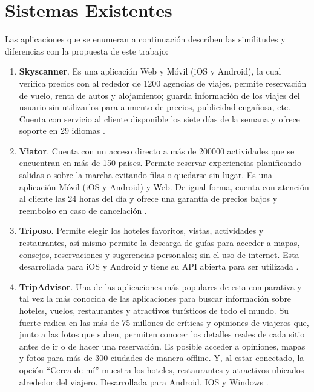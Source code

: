 \section{Sistemas Existentes}

Las aplicaciones que se enumeran a continuación describen las similitudes y diferencias con la propuesta de este trabajo:

\begin{enumerate}
	\item \textbf{Skyscanner}. Es una aplicación Web y Móvil (iOS y Android), la cual verifica precios con al rededor de 1200 agencias de viajes, permite reservación de vuelo, renta de autos y alojamiento; guarda información de los viajes del usuario sin utilizarlos para aumento de precios, publicidad engañosa, etc. Cuenta con servicio al cliente disponible los siete días de la semana y ofrece soporte en 29 idiomas \cite{skyscanner}.  
	
	\item \textbf{Viator}. Cuenta con un acceso directo a más de 200000 actividades que se encuentran en más de 150 países. Permite reservar experiencias planificando salidas o sobre la marcha evitando filas o quedarse sin lugar. Es una aplicación Móvil (iOS y Android) y Web. De igual forma, cuenta con atención al cliente las 24 horas del día y ofrece una garantía de precios bajos y reembolso en caso de cancelación \cite{viator}. 
	
	\item \textbf{Triposo}. Permite elegir los hoteles favoritos, vistas, actividades y restaurantes, así mismo permite la descarga de guías para acceder a mapas, consejos, reservaciones y sugerencias personales; sin el uso de internet. Esta desarrollada para iOS y Android y tiene su API abierta para ser utilizada \cite{triposo}. 
	
	\item \textbf{TripAdvisor}. Una de las aplicaciones más populares de esta comparativa y tal vez la más conocida de las aplicaciones para buscar información sobre hoteles, vuelos, restaurantes y atractivos turísticos de todo el mundo. Su fuerte radica en las más de 75 millones de críticas y opiniones de viajeros que, junto a las fotos que suben, permiten conocer los detalles reales de cada sitio antes de ir o de hacer una reservación. Es posible acceder a opiniones, mapas y fotos para más de 300 ciudades de manera offline. Y, al estar conectado, la opción “Cerca de mí” muestra los hoteles, restaurantes y atractivos ubicados alrededor del viajero. Desarrollada para Android, IOS y Windows \cite{tripAdvisor}.
	

\end{enumerate}

